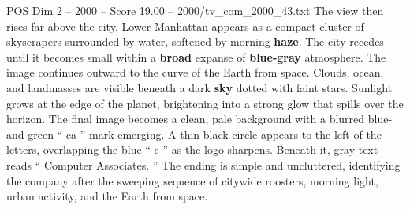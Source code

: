 \begin{textsample}{POS Dim 2 – 2000 – Score 19.00 – 2000/tv\_com\_2000\_43.txt}
The view then rises far above the city.
Lower Manhattan appears as a compact cluster of skyscrapers surrounded by water, softened by morning \textbf{haze}.
The city recedes until it becomes small within a \textbf{broad} expanse of \textbf{blue-gray} atmosphere.
The image continues outward to the curve of the Earth from space.
Clouds, ocean, and landmasses are visible beneath a dark \textbf{sky} dotted with faint stars.
Sunlight grows at the edge of the planet, brightening into a strong glow that spills over the horizon.
The final image becomes a clean, pale background with a blurred blue-and-green “ ca ” mark emerging.
A thin black circle appears to the left of the letters, overlapping the blue “ c ” as the logo sharpens.
Beneath it, gray text reads “ Computer Associates. ” The ending is simple and uncluttered, identifying the company after the sweeping sequence of citywide roosters, morning light, urban activity, and the Earth from space.

\end{textsample}
